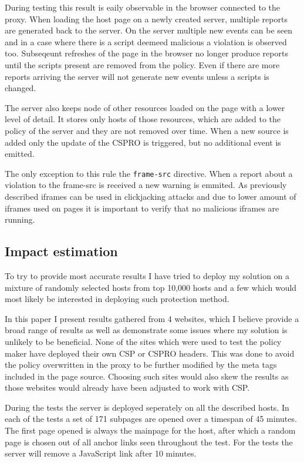 During testing this result is eaily observable in the browser connected to the proxy.
When loading the host page on a newly created server, multiple reports are generated back to the server.
On the server multiple new events can be seen and in a case where there is a script deemeed malicious a violation is observed too.
Subseqeunt refreshes of the page in the browser no longer produce reports until the scripts present are removed from the policy.
Even if there are more reports arriving the server will not generate new events unless a scripts is changed.

The server also keeps node of other resources loaded on the page with a lower level of detail.
It stores only hosts of those resources, which are added to the policy of the server and they are not removed over time.
When a new source is added only the update of the CSPRO is triggered, but no additional event is emitted.

The only exception to this rule the \texttt{frame-src} directive. 
When a report about a violation to the frame-src is received a new warning is emmited.
As previously described iframes can be used in clickjacking attacks and due to lower amount of iframes used on pages it is important to verify that no malicious iframes are running.

\subsection{Impact estimation}

To try to provide most accurate results I have tried to deploy my solution on a mixture of randomly selected hosts from top 10,000 hosts and a few which would most likely be interested in deploying such protection method.

In this paper I present results gathered from 4 websites, which I believe provide a broad range of results as well as demonstrate some issues where my solution is unlikely to be beneficial.
None of the sites which were used to test the policy maker have deployed their own CSP or CSPRO headers.
This was done to avoid the policy overwritten in the proxy to be further modified by the meta tags included in the page source.
Choosing such sites would also skew the results as those websites would already have been adjusted to work with CSP.

During the tests the server is deployed seperately on all the described hosts.
In each of the tests a set of 171 subpages are opened over a timespan of 45 minutes. 
The first page opened is always the mainpage for the host, after which a random page is chosen out of all anchor links seen throughout the test.
For the tests the server will remove a JavaScript link after 10 minutes.


